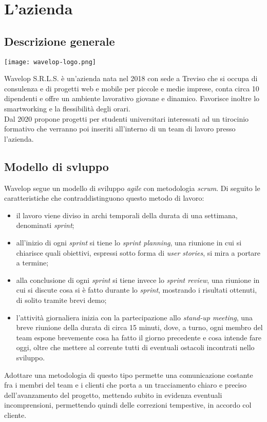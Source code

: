 \chapter{L'azienda}
\label{cap:azienda}

\section{Descrizione generale}

\begin{center}
	\texttt{[image: wavelop-logo.png]}
\end{center}

\noindent Wavelop S.R.L.S. è un'azienda nata nel 2018 con sede a Treviso che si occupa di consulenza e di progetti web e mobile per piccole e medie imprese, conta circa 10 dipendenti e offre un ambiente lavorativo giovane e dinamico. Favorisce inoltre lo smartworking e la flessibilità degli orari.\\
Dal 2020 propone progetti per studenti universitari interessati ad un tirocinio formativo che verranno poi  inseriti all'interno di un team di lavoro presso l'azienda.

\section{Modello di svluppo}

Wavelop segue un modello di sviluppo \textit{agile} con metodologia \textit{scrum}. Di seguito le caratteristiche che contraddistinguono questo metodo di lavoro:

\begin{itemize}
  \item il lavoro viene diviso in archi temporali della durata di una settimana, denominati \textit{sprint};
  \item all'inizio di ogni \textit{sprint} si tiene lo \textit{sprint planning}, una riunione in cui si chiarisce quali obiettivi, espressi sotto forma di \textit{user stories}, si mira a portare a termine;
  \item alla conclusione di ogni \textit{sprint} si tiene invece lo \textit{sprint review}, una riunione in cui si discute cosa si è fatto durante lo \textit{sprint}, mostrando i risultati ottenuti, di solito tramite brevi demo;
  \item l'attività giornaliera inizia con la partecipazione allo \textit{stand-up meeting}, una breve riunione della durata di circa 15 minuti, dove, a turno, ogni membro del team espone brevemente cosa ha fatto il giorno precedente e cosa intende fare oggi, oltre che mettere al corrente tutti di eventuali ostacoli incontrati nello sviluppo.
\end{itemize}

\noindent Adottare una metodologia di questo tipo permette una comunicazione costante fra i membri del team e i clienti che porta a un tracciamento chiaro e preciso dell'avanzamento del progetto, mettendo subito in evidenza eventuali incomprensioni, permettendo quindi delle correzioni tempestive, in accordo col cliente.